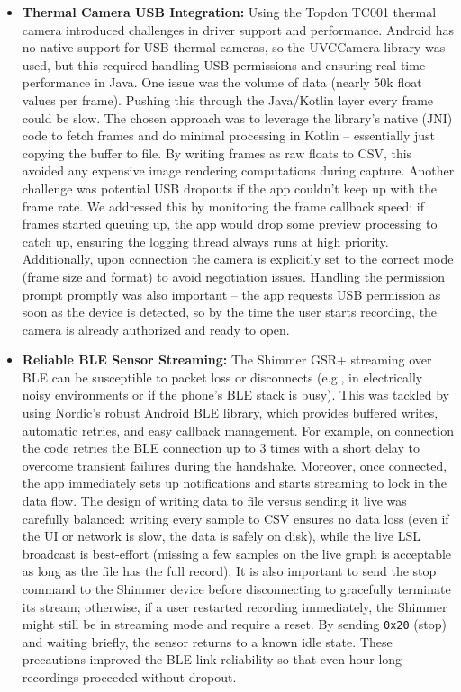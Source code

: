 \begin{itemize}
    \item \textbf{Thermal Camera USB Integration:} Using the Topdon TC001 thermal camera introduced challenges in driver support and performance. Android has no native support for USB thermal cameras, so the UVCCamera library was used, but this required handling USB permissions and ensuring real-time performance in Java. One issue was the volume of data (nearly 50k float values per frame). Pushing this through the Java/Kotlin layer every frame could be slow. The chosen approach was to leverage the library's native (JNI) code to fetch frames and do minimal processing in Kotlin -- essentially just copying the buffer to file. By writing frames as raw floats to CSV, this avoided any expensive image rendering computations during capture. Another challenge was potential USB dropouts if the app couldn't keep up with the frame rate. We addressed this by monitoring the frame callback speed; if frames started queuing up, the app would drop some preview processing to catch up, ensuring the logging thread always runs at high priority. Additionally, upon connection the camera is explicitly set to the correct mode (frame size and format) to avoid negotiation issues. Handling the permission prompt promptly was also important -- the app requests USB permission as soon as the device is detected, so by the time the user starts recording, the camera is already authorized and ready to open.
    \item \textbf{Reliable BLE Sensor Streaming:} The Shimmer GSR+ streaming over BLE can be susceptible to packet loss or disconnects (e.g., in electrically noisy environments or if the phone's BLE stack is busy). This was tackled by using Nordic's robust Android BLE library, which provides buffered writes, automatic retries, and easy callback management. For example, on connection the code retries the BLE connection up to 3 times with a short delay to overcome transient failures during the handshake. Moreover, once connected, the app immediately sets up notifications and starts streaming to lock in the data flow. The design of writing data to file versus sending it live was carefully balanced: writing every sample to CSV ensures no data loss (even if the UI or network is slow, the data is safely on disk), while the live LSL broadcast is best-effort (missing a few samples on the live graph is acceptable as long as the file has the full record). It is also important to send the stop command to the Shimmer device before disconnecting to gracefully terminate its stream; otherwise, if a user restarted recording immediately, the Shimmer might still be in streaming mode and require a reset. By sending \texttt{0x20} (stop) and waiting briefly, the sensor returns to a known idle state. These precautions improved the BLE link reliability so that even hour-long recordings proceeded without dropout.

\end{itemize}

